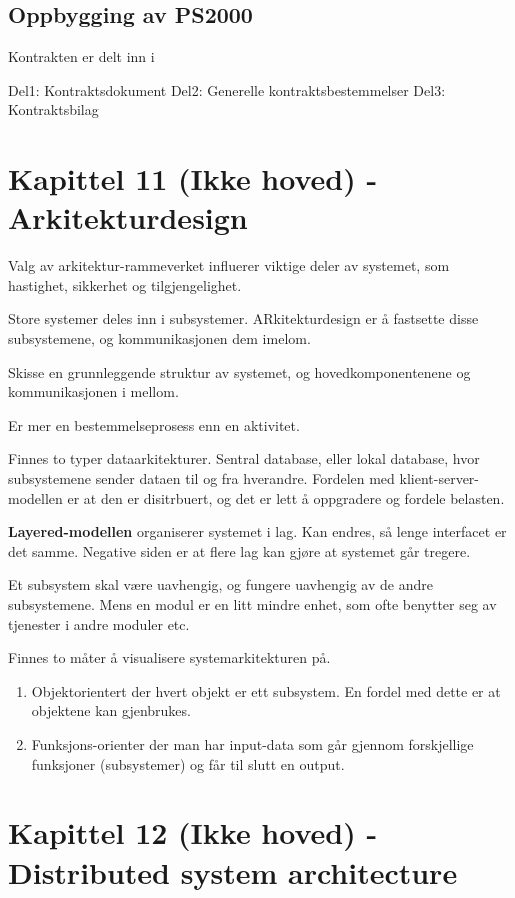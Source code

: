 \documentclass[11pt]{article}
\begin{document}
\subsection{Oppbygging av PS2000}
\label{sec-12.4}

   Kontrakten er delt inn i

   Del1: Kontraktsdokument 
   Del2: Generelle kontraktsbestemmelser 
   Del3: Kontraktsbilag
\section{Kapittel 11 (Ikke hoved) - Arkitekturdesign}
\label{sec-13}

  Valg av arkitektur-rammeverket influerer viktige deler av systemet, som hastighet, sikkerhet og tilgjengelighet. 

  Store systemer deles inn i subsystemer. ARkitekturdesign er å fastsette disse subsystemene, og kommunikasjonen dem imelom.
  
  Skisse en grunnleggende struktur av systemet, og hovedkomponentenene og kommunikasjonen i mellom.

  Er mer en bestemmelseprosess enn en aktivitet. 

  Finnes to typer dataarkitekturer. Sentral database, eller lokal database, hvor subsystemene sender dataen til og fra hverandre. Fordelen med klient-server-modellen er at den er disitrbuert, og det er lett å oppgradere og fordele belasten.

  \textbf{Layered-modellen} organiserer systemet i lag. Kan endres, så lenge interfacet er det samme. Negative siden er at flere lag kan gjøre at systemet går tregere.

  Et subsystem skal være uavhengig, og fungere uavhengig av de andre subsystemene. Mens en modul er en litt mindre enhet, som ofte benytter seg av tjenester i andre moduler etc.

  Finnes to måter å visualisere systemarkitekturen på.

\begin{enumerate}
\item Objektorientert
     der hvert objekt er ett subsystem. En fordel med dette er at objektene kan gjenbrukes.
\item Funksjons-orienter 
     der man har input-data som går gjennom forskjellige funksjoner (subsystemer) og får til slutt en output.
\end{enumerate}
\section{Kapittel 12 (Ikke hoved) - Distributed system architecture}
\label{sec-14}
\end{document}
